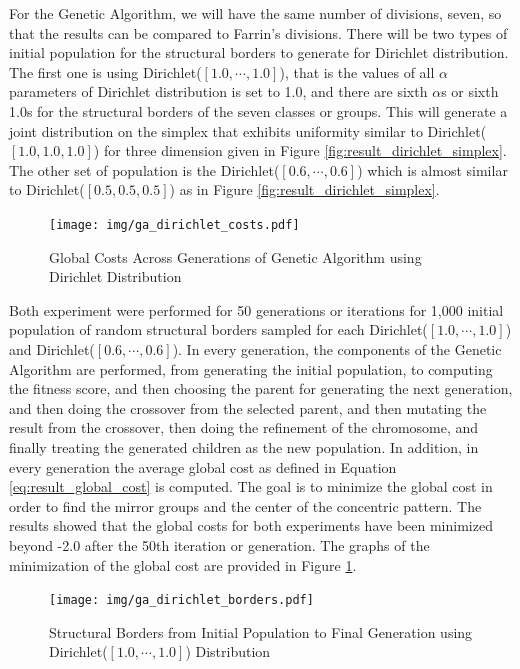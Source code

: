 For the Genetic Algorithm, we will have the same number of divisions, seven, so that the results can be compared to  Farrin's divisions. There will be two types of initial population for the structural borders to generate for Dirichlet distribution. The first one is using Dirichlet($[1.0,\cdots,1.0]$), that is the values of all $\alpha$ parameters of Dirichlet distribution is set to 1.0, and there are sixth $\alpha$s or sixth 1.0s for the structural borders of the seven classes or groups. This will generate a joint distribution on the simplex that exhibits uniformity similar to Dirichlet($[1.0,1.0,1.0]$) for three dimension given in Figure \ref{fig:result_dirichlet_simplex}. The other set of population is the Dirichlet($[0.6,\cdots,0.6]$) which is almost similar to Dirichlet($[0.5,0.5,0.5]$) as in Figure \ref{fig:result_dirichlet_simplex}. 

\begin{figure}[!t]
    \centering
    \texttt{[image: img/ga\_dirichlet\_costs.pdf]}
    \caption{Global Costs Across Generations of Genetic Algorithm using Dirichlet Distribution}
    \label{fig:result_ga_dirichlet_cost}
\end{figure}

Both experiment were performed for 50 generations or iterations for 1,000 initial population of random structural borders sampled for each Dirichlet($[1.0,\cdots,1.0]$) and Dirichlet($[0.6,\cdots,0.6]$). In every generation, the components of the Genetic Algorithm are performed, from generating the initial population, to computing the fitness score, and then choosing the parent for generating the next generation, and then doing the crossover from the selected parent, and then mutating the result from the crossover, then doing the refinement of the chromosome, and finally treating the generated children as the new population. In addition, in every generation the average global cost as defined in Equation \ref{eq:result_global_cost} is computed. The goal is to minimize the global cost in order to find the mirror groups and the center of the concentric pattern. The results showed that the global costs for both experiments have been minimized beyond -2.0 after the 50th iteration or generation. The graphs of the minimization of the global cost are provided in Figure \ref{fig:result_ga_dirichlet_cost}.

\begin{figure}[!t]
    \centering
    \texttt{[image: img/ga\_dirichlet\_borders.pdf]}
    \caption{Structural Borders from Initial Population to Final Generation using Dirichlet($[1.0,\cdots,1.0]$) Distribution}
    \label{fig:result_ga_first_final_borders}
\end{figure}

